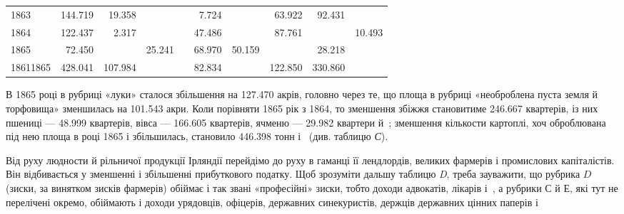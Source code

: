 \begin{table}[H]
\begin{tabularx}{\textwidth}{X*{9}{r}}
    1863 & \num{144.719} & \phantom{0}\num{19.358} & \textemdash{} & \textemdash{} &  \phantom{0}\num{7.724} & \textemdash{} & \phantom{0}\num{63.922} & \phantom{0}\num{92.431} & \textemdash{} \\
    
    1864 & \num{122.437} & \phantom{00}\num{2.317} & \textemdash{} & \textemdash{} & \num{47.486} & \textemdash{} & \phantom{0}\num{87.761} & \textemdash{} & \num{10.493} \\
    
    1865 & \phantom{0}\num{72.450} & \textemdash{} & \num{25.241} & \textemdash{} & \num{68.970} & \num{50.159} & \textemdash{} & \phantom{0}\num{28.218} & \textemdash{} \\
    
    1861\textendash{}1865 & \num{428.041} & \num{107.984} & \textemdash{} & \textemdash{} & \num{82.834} & \textemdash{} & \num{122.850} & \num{330.860} & \textemdash{} \\
  \end{tabularx}
\end{table}
\vspace{-\medskipamount}

\setlength{\tabcolsep}{\tabcolsepdef}

\noindent{}В 1865 році в рубриці «луки» сталося збільшення на \num{127.470} акрів,
головно через те, що площа в рубриці «необроблена пуста
земля й торфовища» зменшилась на \num{101.543} акри. Коли порівняти
1865 рік з 1864, то зменшення збіжжя становитиме \num{246.667}
квартерів, із них пшениці — \num{48.999} квартерів, вівса — \num{166.605} квартерів,
ячменю — \num{29.982} квартери й~; зменшення кількости
картоплі, хоч оброблювана під нею площа в році 1865 і збільшилась,
становило \num{446.398} тонн і~ (див. таблицю \emph{С}).

Від руху людности й рільничої продукції Ірляндії перейдімо
до руху в гаманці її лендлордів, великих фармерів і промислових
капіталістів. Він відбивається у зменшенні і збільшенні прибуткового
податку. Щоб зрозуміти дальшу таблицю \emph{D}, треба зауважити,
що рубрика $D$ (зиски, за винятком зисків фармерів) обіймає
і так звані «професійні» зиски, тобто доходи адвокатів,
лікарів і~, а рубрики $С$ й $Е$, які тут не перелічені окремо,
обіймають і доходи урядовців, офіцерів, державних синекуристів,
держців державних цінних паперів і~
